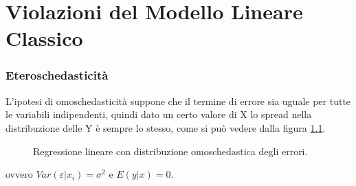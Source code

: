\chapter{Violazioni del Modello Lineare Classico}

\subsection{Eteroschedasticità}
L'ipotesi di omoschedasticità suppone che il termine di errore sia uguale per tutte le variabili indipendenti, quindi dato un certo valore di X lo spread nella distribuzione delle Y è sempre lo stesso, come si può vedere dalla figura \ref{fig:regressione-omoschedastica}.
\begin{figure}[H]
	\centering
	\caption{Regressione lineare con distribuzione omoschedastica degli errori.}
	\label{fig:regressione-omoschedastica}
\end{figure} 
ovvero $Var(\varepsilon \vert x_i) = \sigma^2$ e $E(y \vert x) = 0$.

